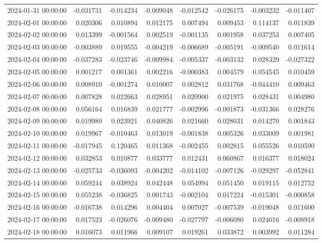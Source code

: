 \begin{tabular}{lrrrrrrr}
2024-01-31 00:00:00 & -0.031731 & -0.014234 & -0.009048 & -0.012542 & -0.026175 & -0.003232 & -0.011407 \\
2024-02-01 00:00:00 & 0.020306 & 0.010894 & 0.012175 & 0.007494 & 0.009453 & 0.114137 & 0.011839 \\
2024-02-02 00:00:00 & 0.013399 & -0.001564 & 0.002519 & -0.001135 & 0.001958 & 0.037253 & 0.007405 \\
2024-02-03 00:00:00 & -0.003889 & 0.019555 & -0.004219 & -0.006689 & -0.005191 & -0.009540 & 0.011614 \\
2024-02-04 00:00:00 & -0.037283 & -0.023746 & -0.009984 & -0.005337 & -0.003132 & 0.028329 & -0.027322 \\
2024-02-05 00:00:00 & 0.001217 & 0.001361 & 0.002216 & -0.000383 & 0.004579 & 0.054545 & 0.010459 \\
2024-02-06 00:00:00 & 0.008910 & -0.001274 & 0.010007 & 0.002812 & 0.031768 & -0.044410 & 0.009463 \\
2024-02-07 00:00:00 & 0.007828 & 0.022663 & 0.028951 & 0.020900 & 0.021975 & 0.028431 & 0.004980 \\
2024-02-08 00:00:00 & 0.056164 & 0.016839 & 0.021777 & -0.002996 & -0.001873 & -0.031366 & 0.028276 \\
2024-02-09 00:00:00 & 0.019989 & 0.023921 & 0.040826 & 0.021660 & 0.028031 & 0.014270 & 0.001843 \\
2024-02-10 00:00:00 & 0.019967 & -0.010463 & 0.013019 & -0.001838 & 0.005326 & 0.033009 & 0.001981 \\
2024-02-11 00:00:00 & -0.017945 & 0.120465 & 0.011368 & -0.002455 & 0.002815 & 0.055526 & 0.010590 \\
2024-02-12 00:00:00 & 0.032853 & 0.010877 & 0.033777 & 0.012431 & 0.060867 & 0.016377 & 0.018024 \\
2024-02-13 00:00:00 & -0.025733 & -0.036093 & -0.004202 & -0.014102 & -0.007126 & -0.029297 & -0.052841 \\
2024-02-14 00:00:00 & 0.059244 & 0.038924 & 0.042448 & 0.054994 & 0.051450 & 0.019115 & 0.012752 \\
2024-02-15 00:00:00 & 0.055238 & -0.036825 & 0.001743 & -0.002104 & 0.017224 & -0.015301 & -0.000858 \\
2024-02-16 00:00:00 & -0.016738 & 0.014296 & 0.004404 & 0.007027 & -0.007539 & -0.019048 & 0.011600 \\
2024-02-17 00:00:00 & 0.017523 & -0.026076 & -0.009480 & -0.027797 & -0.006080 & 0.024016 & -0.008918 \\
2024-02-18 00:00:00 & 0.016073 & 0.011966 & 0.009107 & 0.019261 & 0.033872 & 0.003992 & 0.011284 \\

\end{tabular}
